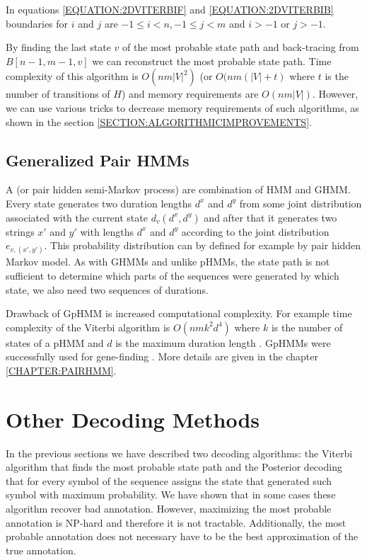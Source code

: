 In equations \ref{EQUATION:2DVITERBIF} and \ref{EQUATION:2DVITERBIB} boundaries for $i$ and $j$ are $
-1\leq i< n,-1\leq j< m$ and $i>-1$ or $j>-1$.


By finding the last state $v$ of the most probable state path and back-tracing
from $B[n-1,m-1,v]$ we can reconstruct the most probable state path. Time
complexity of this algorithm is $O(nm|V|^2)$ (or $O(nm(|V|+t)$ where $t$ is the
number of transitions of $H$) and memory requirements are $O(nm|V|)$. However,
we can use various tricks to decrease memory requirements of such algorithms, as
shown in the section \ref{SECTION:ALGORITHMICIMPROVEMENTS}.

\subsection{Generalized Pair HMMs}


A  (or pair hidden semi-Markov
process) are combination of HMM and GHMM. Every state generates two
duration lengths $d^x$ and $d^y$ from some joint distribution associated with
the current state $d_v(d^x,d^y)$ and after that it generates two strings $x'$
and $y'$ with lengths $d^x$ and $d^y$ according to the joint distribution
$e_{v,(x',y')}$. This probability distribution can by defined for example by
pair hidden Markov model.  As with GHMMs and unlike pHMMs, the state path is not
sufficient to determine which parts of the sequences were generated by which
state, we also need two sequences of durations.

Drawback of GpHMM is increased computational complexity. For example time
complexity of the Viterbi algorithm is $O(nmk^2d^4)$ where $k$
is the number of states of a pHMM and $d$ is the maximum duration length \cite{Meyer2002}.
GpHMMs were successfully used for gene-finding
\cite{SLAM2003,Alexanderson2004,Majoros2005,Meyer2002}. More details are given in
the chapter \ref{CHAPTER:PAIRHMM}.



\section{Other Decoding Methods}
In the previous sections we have described two decoding algorithms: the Viterbi algorithm
that finds the most probable state path  and the Posterior decoding that for
every symbol of the sequence assigns the state that generated such symbol with
maximum probability. 
We have shown that in some cases these algorithm recover bad
annotation. However, maximizing the most probable annotation is NP-hard and
therefore it is not tractable. Additionally, the most probable annotation does
not necessary have to be the best approximation of the true annotation.

